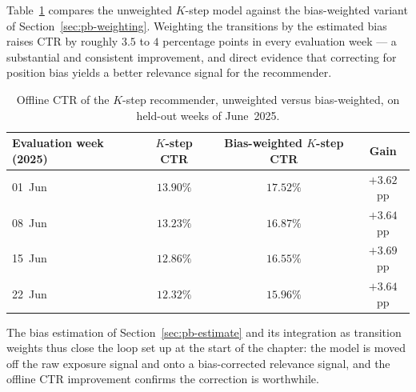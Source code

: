 Table~\ref{tab:pb-ctr} compares the unweighted $K$-step model against the
bias-weighted variant of Section~\ref{sec:pb-weighting}. Weighting the
transitions by the estimated bias raises CTR by roughly $3.5$ to $4$ percentage
points in every evaluation week --- a substantial and consistent improvement,
and direct evidence that correcting for position bias yields a better relevance
signal for the recommender.

\begin{table}[ht]
  \centering
  \caption{Offline CTR of the $K$-step recommender, unweighted versus
           bias-weighted, on held-out weeks of June~2025.}
  \label{tab:pb-ctr}
  \begin{tabular}{lccc}
    \toprule
    Evaluation week (2025) & $K$-step CTR & Bias-weighted $K$-step CTR & Gain \\
    \midrule
    01~Jun & $13.90\%$ & $17.52\%$ & $+3.62$ pp \\
    08~Jun & $13.23\%$ & $16.87\%$ & $+3.64$ pp \\
    15~Jun & $12.86\%$ & $16.55\%$ & $+3.69$ pp \\
    22~Jun & $12.32\%$ & $15.96\%$ & $+3.64$ pp \\
    \bottomrule
  \end{tabular}
\end{table}

\noindent The bias estimation of Section~\ref{sec:pb-estimate} and its
integration as transition weights thus close the loop set up at the start of the
chapter: the model is moved off the raw exposure signal and onto a
bias-corrected relevance signal, and the offline CTR improvement confirms the
correction is worthwhile.
